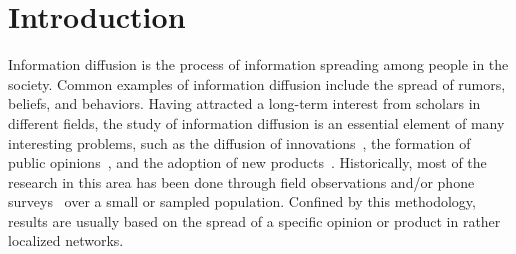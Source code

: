 \documentclass[phd,tocprelim]{cornell}
\begin{document}
\begin{acknowledgements}


\end{acknowledgements}

\contentspage
\tablelistpage
\figurelistpage

\normalspacing \setcounter{page}{1} 
\pagestyle{cornell} \addtolength{\parskip}{0.5\baselineskip}


\chapter{Introduction}\label{chap:introduction}



Information diffusion is the process of information spreading among people in the society. Common examples of information diffusion include the spread of rumors, beliefs, and behaviors. 
Having attracted a long-term interest from scholars in different fields, the study of information diffusion is an essential element of many interesting problems, such
as the diffusion of innovations~\cite{rogers-2003}, the formation of public opinions~\cite{katz_lazarsfeld,Watts-2007}, and the adoption of new products~\cite{Bass:1969}. Historically, most of the research in this area has been done through field observations and/or phone surveys~\cite{katz_57,rogers-2003} over a small or sampled population. Confined by this methodology, results are usually based on the spread of a specific opinion or product in rather localized networks. 
\end{document}
